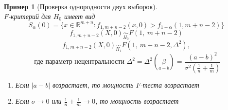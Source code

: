 \documentclass[12pt]{article}
\newtheorem*{example}{Пример}
\theoremstyle{basic_theorem}
\theoremstyle{name_theorem}
\def\R{ \mathbb{R} }
\begin{document}
\begin{example}[Проверка однородности двух выборок]
\[    \]
    $F$-критерий для $H_0$ имеет вид
    \[S_{\alpha}(0)=\{x\in\R^{m+n}:f_{1,m+n-2}(x,0)>f_{1-\alpha}(1,m+n-2)\}\]
    \[f_{1,m+n-2}(X,0)\underset{H_0}{\sim}F(1,\ m+n-2)\]
    \[f_{1,m+n-2}(X,0)\underset{H_1}{\sim}F(1,\ m+n-2,\Delta^2),\]
    \[\text{ где параметр нецентральности } \Delta^2=\Delta^2(\underset{a-b}{\beta})=\frac{(a-b)^2}{\sigma^2\left(\frac{1}{n}+\frac{1}{m}\right)}\]
    \begin{enumerate}
        \item Если $\vert a-b\vert$  возрастает, то мощность $F$-теста возрастает
        \item Если $\sigma\rightarrow0$ или $\frac{1}{n}+\frac{1}{m}\rightarrow0$, то мощность возрастает
    \end{enumerate}
    \end{example}
\end{document}
